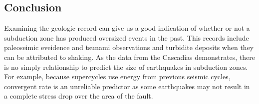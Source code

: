 \documentclass[draft,jgrga]{agutex}
\begin{document}
\begin{article}
\section{Conclusion}
Examining the geologic record can give us a good indication of whether or not a subduction zone has produced oversized events in the past. This records include paleoseimic eveidence and tsunami observations and turbidite deposits when they can be attributed to shaking. As the data from the Cascadias demonstrates, there is no simply relationship to predict the size of earthquakes in subduction zones. For example, because supercycles use energy from previous seismic cycles, convergent rate is an unreliable predictor as some earthquakes may not result in a complete stress drop over the area of the fault. 
\citep{Avouac2015}




















\end{article}
\end{document}
